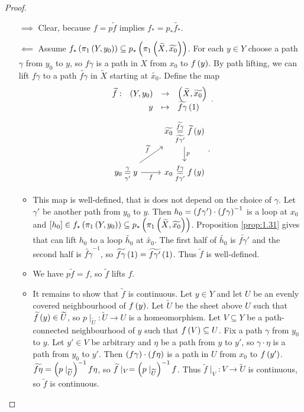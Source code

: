 \begin{proof}
\hfill
\begin{itemize}
\item[$ \implies $] Clear, because $ f = p\widetilde{f} $ implies $ f_* = p_*\widetilde{f_*} $.
\item[$ \impliedby $] Assume $ f_*\left( \pi_1\left( Y, y_0 \right) \right) \subseteq p_*\left( \pi_1\left( \widetilde{X}, \widetilde{x_0} \right) \right) $. For each $ y \in Y $ choose a path $ \gamma $ from $ y_0 $ to $ y $, so $ f\gamma $ is a path in $ X $ from $ x_0 $ to $ f\left( y \right) $. By path lifting, we can lift $ f\gamma $ to a path $ \widetilde{f\gamma} $ in $ \widetilde{X} $ starting at $ \widetilde{x_0} $. Define the map
$$ \function[\widetilde{f}]{\rb{Y, y_0}}{\rb{\widetilde{X}, \widetilde{x_0}}}{y}{\widetilde{f\gamma}\rb{1}}. $$
$$
\begin{tikzcd}
& \widetilde{x_0} \underset{\widetilde{f\gamma'}}{\overset{\widetilde{f\gamma}}{=}} \widetilde{f}\rb{y} \arrow{d}{p} \\
y_0 \underset{\gamma'}{\overset{\gamma}{=}} y \arrow{ur}{\widetilde{f}} \arrow[swap]{r}{f} & x_0 \underset{f\gamma'}{\overset{f\gamma}{=}} f\rb{y}
\end{tikzcd}.
$$
\begin{itemize}
\item This map is well-defined, that is does not depend on the choice of $ \gamma $. Let $ \gamma' $ be another path from $ y_0 $ to $ y $. Then $ h_0 = \left( f\gamma' \right) \cdot \left( f\gamma \right)^{-1} $ is a loop at $ x_0 $ and $ \left[ h_0 \right] \in f_*\left( \pi_1\left( Y, y_0 \right) \right) \subseteq p_*\left( \pi_1\left( \widetilde{X}, \widetilde{x_0} \right) \right) $. Proposition \ref{prop:1.31} gives that can lift $ h_0 $ to a loop $ \widetilde{h_0} $ at $ \widetilde{x_0} $. The first half of $ \widetilde{h_0} $ is $ \widetilde{f\gamma'} $ and the second half is $ \widetilde{f\gamma}^{-1} $, so $ \widetilde{f\gamma}\left( 1 \right) = \widetilde{f\gamma'}\left( 1 \right) $. Thus $ \widetilde{f} $ is well-defined.
\item We have $ p\widetilde{f} = f $, so $ \widetilde{f} $ lifts $ f $.
\item It remains to show that $ \widetilde{f} $ is continuous. Let $ y \in Y $ and let $ U $ be an evenly covered neighbourhood of $ f\left( y \right) $. Let $ \widetilde{U} $ be the sheet above $ U $ such that $ \widetilde{f}\left( y \right) \in \widetilde{U} $, so $ p \mid_{\widetilde{U}} : \widetilde{U} \to U $ is a homeomorphism. Let $ V \subseteq Y $ be a path-connected neighbourhood of $ y $ such that $ f\left( V \right) \subseteq U $. Fix a path $ \gamma $ from $ y_0 $ to $ y $. Let $ y' \in V $ be arbitrary and $ \eta $ be a path from $ y $ to $ y' $, so $ \gamma \cdot \eta $ is a path from $ y_0 $ to $ y' $. Then $ \left( f\gamma \right) \cdot \left( f\eta \right) $ is a path in $ U $ from $ x_0 $ to $ f\left( y' \right) $. $ \widetilde{f\eta} = \left( p \mid_{\widetilde{U}} \right)^{-1}f\eta $, so $ \widetilde{f} \mid_V = \left( p \mid_{\widetilde{U}} \right)^{-1}f $. Thus $ \widetilde{f} \mid_V : V \to \widetilde{U} $ is continuous, so $ \widetilde{f} $ is continuous.
\end{itemize}
\end{itemize}
\end{proof}

